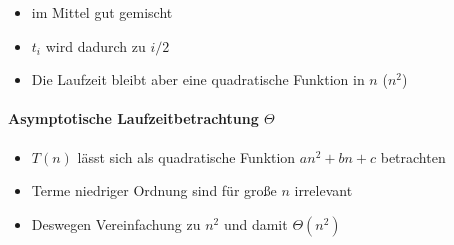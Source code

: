\documentclass[
    ngerman,
    color=3b,
    dark_mode,
    summary,
    boxarc,
]{rubos-tuda-template}
\begin{document}
\begin{description}[itemsep=1em]
    \item [\texttt{Average Case}]
          \begin{itemize}
              \item im Mittel gut gemischt
              \item $t_i$ wird dadurch zu $i/2$
              \item Die Laufzeit bleibt aber eine quadratische Funktion in $n$ ($n^2$)
          \end{itemize}
\end{description}

\paragraph{Asymptotische Laufzeitbetrachtung $\Theta$} {\label{insSortLaufzeitTheta}}
\begin{itemize}
    \item $T(n)$ lässt sich als quadratische Funktion $an^2 + bn + c$ betrachten
    \item Terme niedriger Ordnung sind für gro\ss e $n$ irrelevant
    \item Deswegen Vereinfachung zu $n^2$ und damit $\Theta(n^2)$
\end{itemize}
\clearpage
\end{document}
